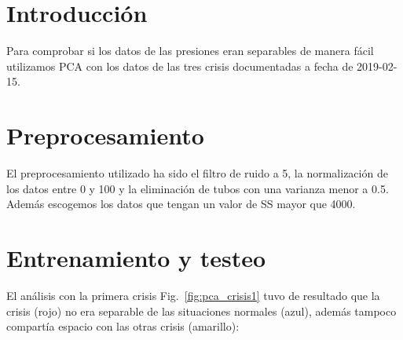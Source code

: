 \documentclass[a4paper,12pt,twoside,oldfontcommands]{memoir}
\begin{document}
\section{Introducción}

Para comprobar si los datos de las presiones eran separables de manera fácil utilizamos PCA con los datos de las tres crisis documentadas a fecha de 2019-02-15.

\section{Preprocesamiento}
El preprocesamiento utilizado ha sido el filtro de ruido a 5, la normalización de los datos entre 0 y 100 y la eliminación de tubos con una varianza menor a 0.5. Además escogemos los datos que tengan un valor de SS mayor que 4000.

\section{Entrenamiento y testeo}
El análisis con la primera crisis Fig.~\ref{fig:pca_crisis1} tuvo de resultado que la crisis (rojo) no era separable de las situaciones normales (azul), además tampoco compartía espacio con las otras crisis (amarillo):
\end{document}
